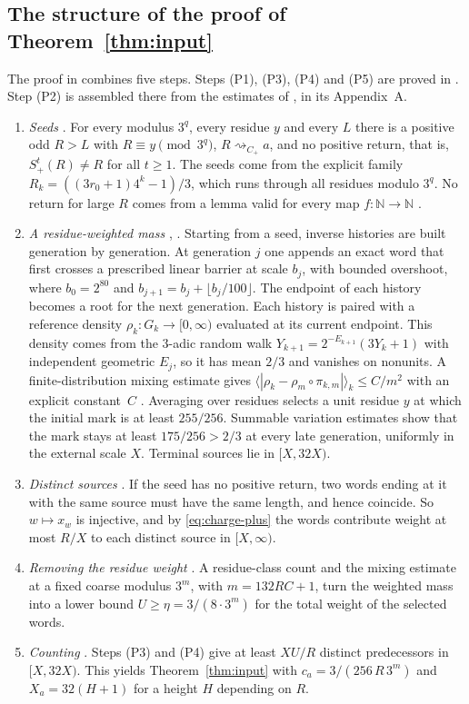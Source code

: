 \documentclass[11pt]{amsart}
\theoremstyle{definition}
\theoremstyle{remark}
\newcommand{\N}{\mathbb{N}}
\newcommand{\Cp}{C_{+}}
\newcommand{\Sp}{S_{+}}
\newcommand{\reach}[1]{\mathrel{\rightsquigarrow_{#1}}}
\begin{document}
\subsection{The structure of the proof of Theorem~\ref{thm:input}}\label{subsec:anatomy}
The proof in \cite{MazurM2} combines five steps. Steps (P1), (P3), (P4) and (P5) are proved in
\cite{MazurM2}. Step (P2) is assembled there from the estimates of \cite{MazurM1}, in its Appendix~A.
\begin{enumerate}[leftmargin=*,label=(P\arabic*)]
\item \emph{Seeds} \cite[\S2]{MazurM2}. For every modulus $3^q$, every residue $y$ and every $L$
  there is a positive odd $R>L$ with $R\equiv y\pmod{3^q}$, $R\reach{\Cp}a$, and no positive
  return, that is, $\Sp^{t}(R)\ne R$ for all $t\ge1$. The seeds come from the explicit family
  $R_k=((3r_0+1)4^k-1)/3$, which runs through all residues modulo $3^q$. No return for large $R$
  comes from a lemma valid for every map $f\colon\N\to\N$ \cite[Lemma~2.1]{MazurM2}.
\item \emph{A residue-weighted mass} \cite[Proposition~3.1 and Appendix~A]{MazurM2},
  \cite[\S\S2--6, 8]{MazurM1}. Starting from a seed, inverse histories are built generation by
  generation. At generation $j$ one appends an exact word that first crosses a prescribed linear
  barrier at scale $b_j$, with bounded overshoot, where $b_0=2^{80}$ and $b_{j+1}=b_j+\lfloor
  b_j/100\rfloor$. The endpoint of each history becomes a root for the next generation. Each
  history is paired with a reference density $\rho_k\colon G_k\to[0,\infty)$ evaluated at its
  current endpoint. This density comes from the $3$-adic random walk
  $Y_{k+1}=2^{-E_{k+1}}(3Y_k+1)$ with independent geometric $E_j$, so it has mean $2/3$ and
  vanishes on nonunits. A finite-distribution mixing estimate gives
  $\langle|\rho_k-\rho_m\circ\pi_{k,m}|\rangle_k\le C/m^2$
  with an explicit constant~$C$ \cite[Lemma~8.1]{MazurM1}. Averaging over residues selects a unit
  residue $y$ at which the initial mark is at least $255/256$. Summable variation estimates show
  that the mark stays at least $175/256>2/3$ at every late generation, uniformly in the external
  scale $X$.
  Terminal sources lie in $[X,32X)$.
\item \emph{Distinct sources} \cite[Lemma~4.1]{MazurM2}. If the seed has no positive return, two
  words ending at it with the same source must have the same length, and hence coincide. So
  $w\mapsto x_w$ is injective, and by \eqref{eq:charge-plus} the words contribute weight at most
  $R/X$ to each distinct source in $[X,\infty)$.
\item \emph{Removing the residue weight} \cite[\S4.2]{MazurM2}. A residue-class count and the
  mixing estimate at a fixed coarse modulus $3^m$, with $m=132RC+1$, turn the weighted mass into a
  lower bound $U\ge\eta=3/(8\cdot3^m)$ for the total weight of the selected words.
\item \emph{Counting} \cite[\S4.3]{MazurM2}. Steps (P3) and (P4) give at least $XU/R$ distinct
  predecessors in $[X,32X)$. This yields Theorem~\ref{thm:input} with
  $c_a=3/(256\,R\,3^m)$ and $X_a=32(H+1)$ for a height $H$ depending on $R$.
\end{enumerate}
\end{document}
